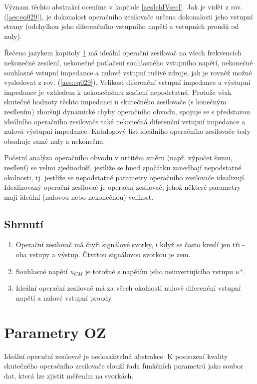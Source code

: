       Význam těchto abstrakcí oceníme v kapitole \ref{aesIchIVsecI}. Jak je vidět z rov.
      (\ref{aes:eq029}), je dokonalost operačního zesilovače určena dokonalosti jeho vstupní strany
      (odchylkou jeho diferenčního vstupního napětí a vstupních proudů od nuly).

      Řečeno jazykem kapitoly \ref{aesIchIIIsecII} má ideální operační zesilovač na všech
      frekvencích nekonečné zesilení, nekonečné potlačení souhlasného vstupního napětí, nekonečné
      souhlasné vstupní impedance a nulové vstupní rušivé zdroje, jak je rovněž možné vysledovat z
      rov. (\ref{aes:eq029}). Velikost diferenční vstupní impedance a výstupní impedance je vzhledem
      k nekonečnému zesílení nepodstatná. Protože však skutečné hodnoty těchto impedanci u
      skutečného zesilovače (s konečným zesílením) zhoršují dynamické chyby operačního obvodu,
      spojuje se s představou ideálního operačního zesilovače také nekonečná diferenční vstupní
      impedance a nulová výstupní impedance. Katalogový list ideálního operačního zesilovače tedy
      obsahuje samé nuly a nekonečna.

      Početní analýza operačního obvodu v určitém směru (např. výpočet šumu, zesílení) se velmi
      zjednoduší, jestliže se hned zpočátku zanedbají nepodstatné okolnosti, tj. jestliže se
      nepodstatné parametry operačního zesilovače idealizují. Idealizovaný operační zesilovač je
      operační zesilovač, jehož některé parametry mají ideální (nulovou nebo nekonečnou) velikost.

    \subsection{Shrnutí}\label{aesIchIIIsecIssecIV}
      \begin{enumerate}[noitemsep]
        \item Operační zesilovač má čtyři signálové svorky, i když se často kreslí jen tři - oba 
              vstupy a výstup. Čtvrtou signálovou svorkou je zem.
        \item Souhlasné napětí $u_{CM}$ je totožné s napětím jeho neinvertujícího vstupu $u^+$.
        \item Ideální operační zesilovač má za všech okolností nulové diferenční vstupní napětí a  
              nulové vstupní proudy.
      \end{enumerate}
    
  \section{Parametry OZ}\label{aesIchIIIsecII}
    Ideální operační zesilovač je nedosažitelná abstrakce. K posouzení kvality sku\-teč\-ného 
    operačního zesilovače slouží řada funkčních parametrů jako soubor dat, která lze zjistit 
    měřením na svorkách.
   
